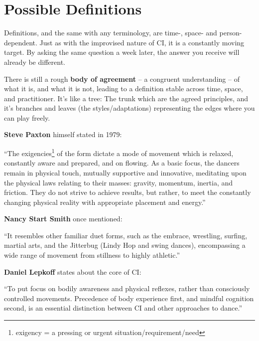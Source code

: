 \section{Possible Definitions}\label{sec:possible-definitions}

Definitions, and the same with any terminology, are time-, space- and person-dependent.
Just as with the improvised nature of CI, it is a constantly moving target.
By asking the same question a week later, the answer you receive will already be different.

There is still a rough \textbf{body of agreement} -- a congruent understanding -- of what it is, and what it is not, leading to a definition stable across time, space, and practitioner.
It's like a tree: The trunk which are the agreed principles, and it's branches and leaves (the styles/adaptations) representing the edges where you can play freely.

\textbf{Steve Paxton} himself stated in 1979:
\begin{displayquote}
	``The exigencies\footnote{exigency = a pressing or urgent situation/requirement/need} of the form dictate a mode of movement which is relaxed, constantly aware and prepared, and on flowing.
	As a basic focus, the dancers remain in physical touch, mutually supportive and innovative, meditating upon the physical laws relating to their masses: gravity, momentum, inertia, and friction.
	They do not strive to achieve results, but rather, to meet the constantly changing physical reality with appropriate placement and energy.''
\end{displayquote}

\textbf{Nancy Start Smith} once mentioned:
\begin{displayquote}
	``It resembles other familiar duet forms, such as the embrace, wrestling, surfing, martial arts, and the Jitterbug (Lindy Hop and swing dances), encompassing a wide range of movement from stillness to highly athletic.''
\end{displayquote}

\textbf{Daniel Lepkoff} states about the core of CI:
\begin{displayquote}
	``To put focus on bodily awareness and physical reflexes, rather than consciously controlled movements.
	Precedence of body experience first, and mindful cognition second, is an essential distinction between CI and other approaches to dance.''
\end{displayquote}

